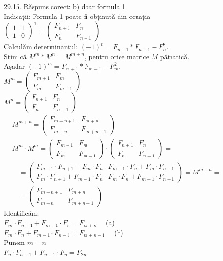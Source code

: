 29.15. Răspuns corect: b) doar formula 1\\
Indicații: Formula 1 poate fi obținută din ecuația\\ $\left(\begin{array}{ll}1 & 1 \\ 1 & 0\end{array}\right)^{n}=\left(\begin{array}{cc}F_{n+1} & F_{n} \\ F_{n} & F_{n-1}\end{array}\right)$\\ Calculăm determinantul: $(-1)^{n}=F_{n+1} * F_{n-1}-F_{n}^{2}$.\\ Știm că $M^{m} * M^{n}=M^{m+n}$, pentru orice matrice $M$ pătratică.\\ Așadar $(-1)^{m}=F_{m+1} * F_{m-1}-F_{m}^{2}$.\\ $M^{m}=\left(\begin{array}{cc}F_{m+1} & F_{m} \\ F_{m} & F_{m-1}\end{array}\right)$\\ $M^{n}=\left(\begin{array}{cc}F_{n+1} & F_{n} \\ F_{n} & F_{n-1}\end{array}\right)$\\ $\begin{aligned} & M^{m+n}=\left(\begin{array}{cc} F_{m+n+1} & F_{m+n} \\ F_{m+n} & F_{m+n-1} \end{array}\right) \\ & M^{m} \cdot M^{m}=\left(\begin{array}{cc} F_{m+1} & F_{m} \\ F_{m} & F_{m-1} \end{array}\right) \cdot\left(\begin{array}{cc} F_{n+1} & F_{n} \\ F_{n} & F_{n-1} \end{array}\right)= \\ & \quad=\left(\begin{array}{cc} F_{m+1} \cdot F_{n+1}+F_{m} \cdot F_{n} & F_{m+1} \cdot F_{n}+F_{m} \cdot F_{n-1} \\ F_{m} \cdot F_{n+1}+F_{m-1} \cdot F_{n} & F_{m} \cdot F_{n}+F_{m-1} \cdot F_{n-1} \end{array}\right)=M^{m+n}= \\ & \quad=\left(\begin{array}{cc} F_{m+n+1} & F_{m+n} \\ F_{m+n} & F_{m+n-1} \end{array}\right) \end{aligned}$\\ Identificăm:\\ $F_{m} \cdot F_{n+1}+F_{m-1} \cdot F_{n}=F_{m+n} \quad$ (a)\\ $F_{m} \cdot F_{n}+F_{m-1} \cdot F_{n-1}=F_{m+n-1} \quad$ (b)\\ Punem $m=n$\\ $F_{n} \cdot F_{n+1}+F_{n-1} \cdot F_{n}=F_{2 n} \quad$ 